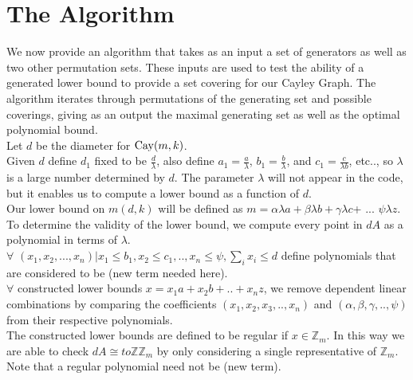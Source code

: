 

\section{The Algorithm}

We now provide an algorithm that takes as an input a set of generators as well as two other permutation sets. These inputs are used to test the ability of a generated lower bound to provide a set covering for our Cayley Graph. The algorithm iterates through permutations of the generating set and possible coverings, giving as an output the maximal generating set as well as the optimal polynomial bound.\\

Let $d$ be the diameter for $\operatorname{Cay}(m, k)$.\\

Given $d$ define $d_{1}$ fixed to be $\frac{d}{\lambda}$, also define $a_{1} = \frac{a}{\lambda}$, $b_{1} = \frac{b}{\lambda}$, and $c_{1} = \frac{c}{\lambda b}$, etc.., so $\lambda$ is a large number determined by $d$. The parameter $\lambda$ will not appear in the code, but it enables us to compute a lower bound as a function of $d$.\\

Our lower bound on $m(d, k)$ will be defined as $m =\alpha \lambda a + \beta \lambda b + \gamma \lambda c$+ ... $\psi \lambda z$.  To determine the validity of the lower bound, we compute every point in $dA$ as a polynomial in terms of $\lambda$.\\

$\forall$ ${(x_{1}, x_{2}, ... , x_{n}) \vert x_{1} \leq b_{1}, x_{2} \leq c_{1}, .. , x_{n} \leq \psi, \sum_{i} x_{i} \leq d}$ define polynomials that are considered to be (new term needed here).\\

$\forall$ constructed lower bounds $x = x_{1}a + x_{2}b + .. + x_{n}z$, we remove dependent linear combinations by comparing the coefficients $(x_{1}, x_{2}, x_{3}, .. , x_{n})$ and $(\alpha, \beta, \gamma, .. , \psi)$ from their respective polynomials.\\

The constructed lower bounds are defined to be regular if $x \in \mathbb{Z}_{m}$. In this way we are able to check $dA \cong to \mathbb{ZZ}_{m}$ by only considering a single representative of $\mathbb{Z}_{m}$.
\\ Note that a regular polynomial need not be (new term).\\

